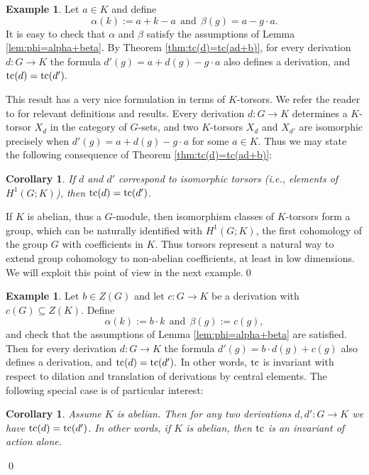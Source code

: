 \documentclass[11pt]{amsart}
\theoremstyle{plain}
\newtheorem{corollary}[theorem]{Corollary}
\theoremstyle{definition}
\newtheorem{example}[theorem]{Example}
\newcommand{\tc}{\mathop{\rm tc}\nolimits}
\begin{document}
\begin{example}\label{ex:conjugate}
Let $a\in K$ and define 
$$\alpha(k):=a+k-a\ \ \text{and}\ \ \beta(g)=a-g\cdot a.$$ 
It is easy to check that 
$\alpha$ and $\beta$ satisfy the assumptions of Lemma \ref{lem:phi=alpha+beta}. 
By Theorem \ref{thm:tc(d)=tc(ad+b)}, for every derivation $d\colon G\to K$ the formula
$d'(g)=a+d(g)-g\cdot a$ also defines a derivation, and $\tc(d)=\tc(d').$

This result has a very nice formulation in terms of $K$-torsors. We refer the reader to 
\cite[Sec. I.2]{NSW} for relevant definitions and results. Every derivation $d\colon G\to K$
determines a $K$-torsor $X_d$ in the category of $G$-sets, and two $K$-torsors $X_d$ and 
$X_{d'}$ are isomorphic precisely when $d'(g)=a+d(g)-g\cdot a$ for some $a\in K$.
Thus we may state the following consequence of Theorem \ref{thm:tc(d)=tc(ad+b)}:

\begin{corollary}\label{cor:torsors}
If $d$ and $d'$ correspond to isomorphic torsors 
(i.e., elements of $H^1(G;K)$), then $\tc(d)=\tc(d')$.    
\end{corollary}

If $K$ is abelian, thus a $G$-module, then isomorphism classes of $K$-torsors form a group, which can be
naturally identified with $H^1(G;K)$, the first cohomology of the group $G$ with coefficients in $K$. 
Thus torsors represent a natural way to extend group cohomology to non-abelian coefficients, at least
in low dimensions. We will exploit this point of view in the next example.\qed
\end{example}

\begin{example}\label{ex:central}
Let $b\in Z(G)$  and let $c\colon G\to K$ be a derivation with $c(G)\subseteq Z(K)$. Define
$$\alpha(k):=b\cdot k\ \ \text{and}\ \ \beta(g):=c(g),$$
and check that the assumptions of Lemma \ref{lem:phi=alpha+beta} are satisfied. Then for every
derivation $d\colon G\to K$ the formula $d'(g)=b\cdot d(g)+c(g)$ also defines a derivation, 
and $\tc(d)=\tc(d').$ In other words, $\tc$ is invariant with respect to dilation and translation
of derivations by central elements. The following special case is of particular interest:

\begin{corollary}\label{cor:K abelian}
Assume $K$ is abelian. Then for any two derivations $d,d'\colon G\to K$ we have $\tc(d)=\tc(d')$. 
In other words, if $K$ is abelian, then $\tc$ is an invariant of action alone.
\end{corollary}
\qed
\end{example} 
\end{document}
